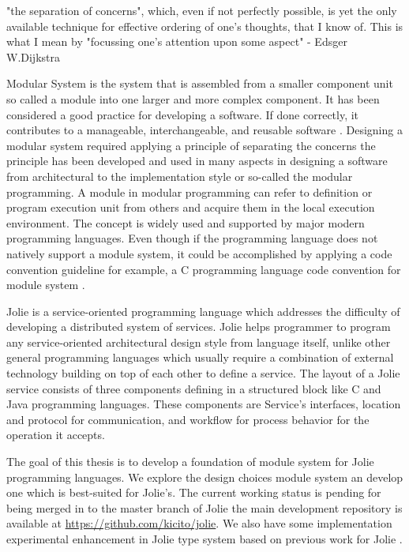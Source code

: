 \begin{displayquote}
    "the separation of concerns", which, even if not perfectly possible, is yet the only available technique for effective ordering of one's thoughts, that I know of. This is what I mean by "focussing one's attention upon some aspect" 
    - Edsger W.Dijkstra\cite{dijkstra1974}
\end{displayquote}

Modular System is the system that is assembled from a smaller component unit so called a module into one larger and more complex component. It has been considered a good practice for developing a software. If done correctly, it contributes to a manageable, interchangeable, and reusable software \cite{MMM}. Designing a modular system required applying a principle of separating the concerns the principle has been developed and used in many aspects in designing a software from architectural to the implementation style or so-called the modular programming. A module in modular programming can refer to definition or program execution unit from others and acquire them in the local execution environment. The concept is widely used and supported by major modern programming languages. Even though if the programming language does not natively support a module system, it could be accomplished by applying a code convention guideline for example, a C programming language code convention for module system \cite{staff2001}.

Jolie\cite{JOLIE} is a service-oriented programming language which addresses the difficulty of developing a distributed system of services. Jolie helps programmer to program any service-oriented architectural design style from language itself, unlike other general programming languages which usually require a combination of external technology building on top of each other to define a service. The layout of a Jolie service consists of three components defining in a structured block like C and Java programming languages. These components are Service's interfaces, location and protocol for communication, and workflow for process behavior for the operation it accepts.


The goal of this thesis is to develop a foundation of module system for Jolie programming languages. We explore the design choices module system an develop one which is best-suited for Jolie's. The current working status is pending for being merged in to the master branch of Jolie the main development repository is available at \url{https://github.com/kicito/jolie}.
We also have some implementation experimental enhancement in Jolie type system based on previous work for Jolie \cite{DBLP:journals/corr/TchitchiginSMEM16}.

